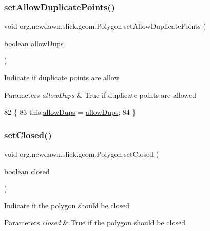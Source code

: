 \subsubsection{\texorpdfstring{set\+Allow\+Duplicate\+Points()}{setAllowDuplicatePoints()}}
{\footnotesize\ttfamily void org.\+newdawn.\+slick.\+geom.\+Polygon.\+set\+Allow\+Duplicate\+Points (\begin{DoxyParamCaption}\item[{boolean}]{allow\+Dups }\end{DoxyParamCaption})\hspace{0.3cm}{\ttfamily [inline]}}

Indicate if duplicate points are allow


\begin{DoxyParams}{Parameters}
{\em allow\+Dups} & True if duplicate points are allowed \\
\hline
\end{DoxyParams}

\begin{DoxyCode}
82                                                            \{
83         this.\mbox{\hyperlink{classorg_1_1newdawn_1_1slick_1_1geom_1_1_polygon_a425e8151c71ea31ba03f5d147f9ef79a}{allowDups}} = \mbox{\hyperlink{classorg_1_1newdawn_1_1slick_1_1geom_1_1_polygon_a425e8151c71ea31ba03f5d147f9ef79a}{allowDups}};
84     \}
\end{DoxyCode}
\mbox{\label{classorg_1_1newdawn_1_1slick_1_1geom_1_1_polygon_a3dcb8dc9ee8f7309d29583aa7730cffb}} 
\subsubsection{\texorpdfstring{set\+Closed()}{setClosed()}}
{\footnotesize\ttfamily void org.\+newdawn.\+slick.\+geom.\+Polygon.\+set\+Closed (\begin{DoxyParamCaption}\item[{boolean}]{closed }\end{DoxyParamCaption})\hspace{0.3cm}{\ttfamily [inline]}}

Indicate if the polygon should be closed


\begin{DoxyParams}{Parameters}
{\em closed} & True if the polygon should be closed \\
\hline
\end{DoxyParams}

